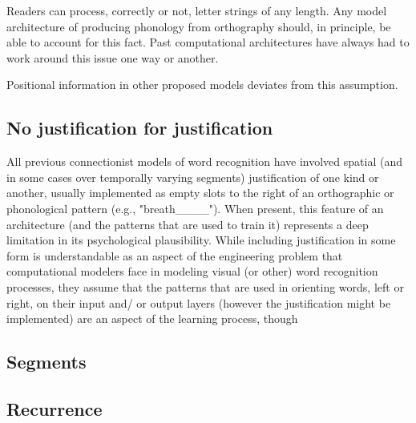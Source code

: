 \documentclass[
  american,
  man,floatsintext]{apa6}
\begin{document}
Readers can process, correctly or not, letter strings of any length. Any model architecture of producing phonology from orthography should, in principle, be able to account for this fact. Past computational architectures have always had to work around this issue one way or another.

Positional information in other proposed models deviates from this assumption.

\hypertarget{no-justification-for-justification}{%
\subsection{No justification for justification}\label{no-justification-for-justification}}

All previous connectionist models of word recognition have involved spatial (and in some cases over temporally varying segments) justification of one kind or another, usually implemented as empty slots to the right of an orthographic or phonological pattern (e.g., "breath\_\_\_\_"). When present, this feature of an architecture (and the patterns that are used to train it) represents a deep limitation in its psychological plausibility. While including justification in some form is understandable as an aspect of the engineering problem that computational modelers face in modeling visual (or other) word recognition processes, they assume that the patterns that are used in orienting words, left or right, on their input and/ or output layers (however the justification might be implemented) are an aspect of the learning process, though

\hypertarget{segments}{%
\subsection{Segments}\label{segments}}

\hypertarget{recurrence}{%
\subsection*{Recurrence}\label{recurrence}}
\end{document}
